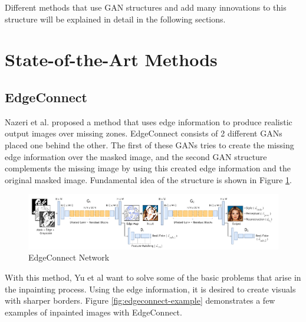Different methods that use GAN structures and add many innovations to this structure will be explained in detail in the following sections.

\newpage
\section{State-of-the-Art Methods}

\subsection{EdgeConnect}

Nazeri et al. proposed a method \cite{edgeconnect} that uses edge information to produce realistic output images over missing zones.  EdgeConnect consists of 2 different GANs placed one behind the other. The first of these GANs tries to create the missing edge information over the masked image, and the second GAN structure complements the missing image by using this created edge information and the original masked image. Fundamental idea of the structure is shown in Figure \ref{fig:edgeconnect-network}.

\begin{figure}[h!]
    \centering
    \includegraphics[scale=0.6]{figures/chapter4/EdgeConnect.PNG}
    \vspace*{5mm}
    \caption{EdgeConnect Network \cite{edgeconnect}}
    \label{fig:edgeconnect-network}
\end{figure}

With this method, Yu et al want to solve some of the basic problems that arise in the inpainting process. Using the edge information, it is desired to create visuals with sharper borders. Figure \ref{fig:edgeconnect-example} demonstrates a few examples of inpainted images with EdgeConnect.

